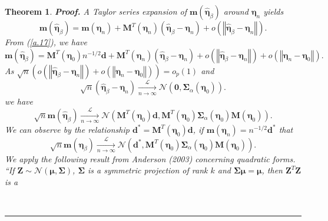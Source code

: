 \documentclass[a4paper]{article}%
\newtheorem{theorem}{Theorem}
\newenvironment{proof}[1][Proof]{\noindent \textbf{#1.} }{\  \rule{0.5em}{0.5em}}
\begin{document}
\begin{theorem}
\begin{proof}
A Taylor series expansion of $\boldsymbol{m}(\widehat{\boldsymbol{\eta}%
}_{\beta})$ around $\boldsymbol{\eta}_{n}$ yields%
\[
\boldsymbol{m}(\widehat{\boldsymbol{\eta}}_{\beta})=\boldsymbol{m}\left(
\boldsymbol{\eta}_{n}\right)  +\boldsymbol{M}^{T}\left(  \boldsymbol{\eta}%
_{n}\right)  (\widehat{\boldsymbol{\eta}}_{\beta}-\boldsymbol{\eta}%
_{n})+o\left(  \left\Vert \widehat{\boldsymbol{\eta}}_{\beta}-\boldsymbol{\eta
}_{n}\right\Vert \right)  .
\]
From (\ref{a.17}), we have
\[
\boldsymbol{m}(\widehat{\boldsymbol{\eta}}_{\beta})=\boldsymbol{M}%
^{T}(\boldsymbol{\eta}_{0})n^{-1/2}\boldsymbol{d}+\boldsymbol{M}^{T}\left(
\boldsymbol{\eta}_{n}\right)  (\widehat{\boldsymbol{\eta}}_{\beta
}-\boldsymbol{\eta}_{n})+o\left(  \left\Vert \widehat{\boldsymbol{\eta}%
}_{\beta}-\boldsymbol{\eta}_{n}\right\Vert \right)  +o\left(  \left\Vert
\boldsymbol{\eta}_{n}-\boldsymbol{\eta}_{0}\right\Vert \right)  .
\]
As $\sqrt{n}\left(  o\left(  \left\Vert \widehat{\boldsymbol{\eta}}_{\beta
}-\boldsymbol{\eta}_{n}\right\Vert \right)  +o\left(  \left\Vert
\boldsymbol{\eta}_{n}-\boldsymbol{\eta}_{0}\right\Vert \right)  \right)
=o_{p}\left(  1\right)  $ and%
\[
\sqrt{n}(\widehat{\boldsymbol{\eta}}_{\beta}-\boldsymbol{\eta}_{n}%
)\underset{n\rightarrow\infty}{\overset{\mathcal{L}}{\longrightarrow}%
}\mathcal{N}(\boldsymbol{0},\boldsymbol{\Sigma}_{\alpha}(\boldsymbol{\eta}%
_{0})).
\]
we have
\[
\sqrt{n}\boldsymbol{m}(\widehat{\boldsymbol{\eta}}_{\beta}%
)\underset{n\rightarrow\infty}{\overset{\mathcal{L}}{\longrightarrow}%
}\mathcal{N}(\boldsymbol{M}^{T}(\boldsymbol{\eta}_{0})\boldsymbol{d}%
,\boldsymbol{M}^{T}(\boldsymbol{\eta}_{0})\boldsymbol{\Sigma}_{\alpha
}(\boldsymbol{\eta}_{0})\boldsymbol{M}(\boldsymbol{\eta}_{0})).
\]
We can observe by the relationship $\boldsymbol{d}^{\ast}\boldsymbol{=M}%
^{T}(\boldsymbol{\eta}_{0})\boldsymbol{d}$, if $\boldsymbol{m}\left(
\boldsymbol{\eta}_{n}\right)  =n^{-1/2}\boldsymbol{d}^{\ast}$ that
\[
\sqrt{n}\boldsymbol{m}(\widehat{\boldsymbol{\eta}}_{\beta}%
)\underset{n\rightarrow\infty}{\overset{\mathcal{L}}{\longrightarrow}%
}\mathcal{N}(\boldsymbol{d}^{\ast},\boldsymbol{M}^{T}(\boldsymbol{\eta}%
_{0})\boldsymbol{\Sigma}_{\alpha}(\boldsymbol{\eta}_{0})\boldsymbol{M}%
(\boldsymbol{\eta}_{0})).
\]
We apply the following result from Anderson (2003) concerning quadratic forms. \textquotedblleft If
$\boldsymbol{Z\sim}\mathcal{N}\left(  \boldsymbol{\mu},\boldsymbol{\Sigma
}\right)  $, $\boldsymbol{\Sigma}$ is a symmetric projection of rank $k$ and
$\boldsymbol{\Sigma\mu=\mu}$, then $\boldsymbol{Z}^{T}\boldsymbol{Z}$ is a

\end{proof}
\end{theorem}
\end{document}
